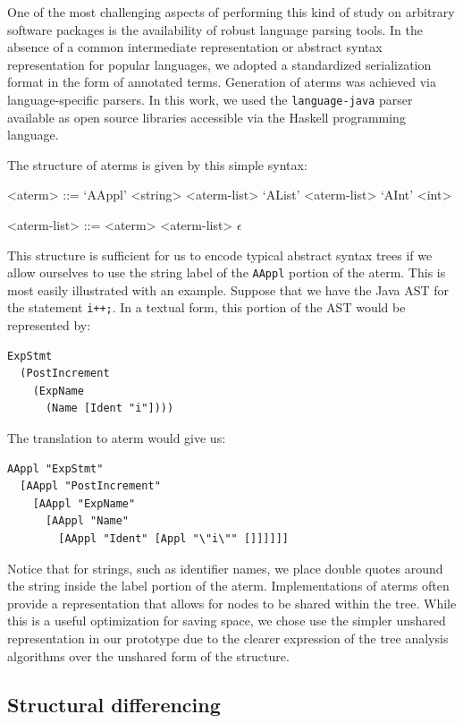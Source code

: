 One of the most challenging aspects of performing this kind of study on
arbitrary software packages is the availability of robust language parsing
tools.  In the absence of a common intermediate representation or abstract
syntax representation for popular languages, we adopted a standardized
serialization format in the form of annotated terms.  Generation of aterms was
achieved via language-specific parsers.  In this work, we used the
{\tt language-java} parser available as open source libraries accessible via the
Haskell programming language.

The structure of aterms is given by this simple syntax:
\setlength{\grammarindent}{8em}
\begin{grammar}
<aterm> ::= `AAppl' <string> <aterm-list>
\alt `AList' <aterm-list>
\alt `AInt' <int>

<aterm-list> ::= <aterm> <aterm-list>
\alt $\epsilon$
\end{grammar}

This structure is sufficient for us to encode typical abstract syntax trees if
we allow ourselves to use the string label of the {\tt AAppl} portion of the
aterm. This is most easily illustrated with an example.  Suppose that we have
the Java AST for the statement {\tt i++;}.  In a textual form, this portion of
the AST would be represented by:

\begin{verbatim}
ExpStmt
  (PostIncrement
    (ExpName
      (Name [Ident "i"])))
\end{verbatim}

The translation to aterm would give us:

\begin{verbatim}
AAppl "ExpStmt"
  [AAppl "PostIncrement"
    [AAppl "ExpName"
      [AAppl "Name"
        [AAppl "Ident" [Appl "\"i\"" []]]]]]
\end{verbatim}

Notice that for strings, such as identifier names, we place double quotes
around the string inside the label portion of the aterm. Implementations of
aterms often provide a representation that allows for nodes to be shared
within the tree. While this is a useful optimization for saving space, we
chose use the simpler unshared representation in our prototype due to the
clearer expression of the tree analysis algorithms over the unshared form of
the structure.

\subsection{Structural differencing}


